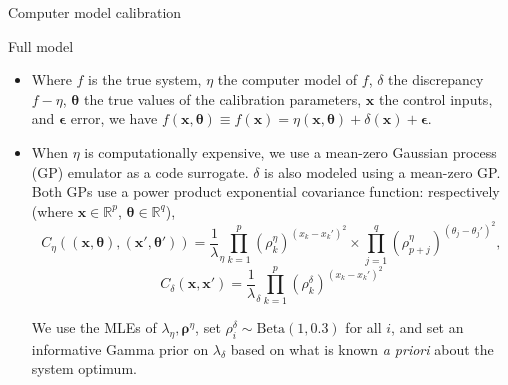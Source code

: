 \documentclass[final]{beamer}
\newlength{\onecolwid}
\begin{document}
\begin{frame}[t]
\begin{columns}[t]
\begin{column}{\onecolwid}
\begin{alertblock}{Computer model calibration}
\begin{itemize}
\end{itemize}

\end{alertblock}


\begin{alertblock}{Full model}

\begin{itemize}

\item Where $f$ is the true system, $\eta$ the computer model of $f$, $\delta$ the discrepancy $f-\eta$, $\boldsymbol \theta$ the true values of the calibration parameters, $\mathbf x$ the control inputs, and $\boldsymbol \epsilon$ error, we have $f(\mathbf x,\boldsymbol \theta) \equiv f(\mathbf x) = \eta(\mathbf x,\boldsymbol \theta) + \delta(\mathbf x) + \boldsymbol \epsilon$.
%
\item When $\eta$ is computationally expensive, we use a mean-zero Gaussian process (GP) emulator as a code surrogate.
%
%
$\delta$ is also modeled using a mean-zero GP. Both GPs use a power product exponential covariance function: respectively (where $\mathbf x\in\mathbb R^p$, $\boldsymbol\theta\in\mathbb R^q$),
\vspace{-3mm}
\[
C_\eta(\!(\mathbf x,\!\boldsymbol\theta),\!(\mathbf x'\!,\!\boldsymbol\theta')\!)\! = \frac1\lambda_\eta \prod_{k=1}^{p}\left(\rho^\eta_k\right)^{\left(x_k -x_k'\right)^2}
\times
\prod_{j=1}^{q}\left( \rho^\eta_{p+j}\right)^{\left(\theta_j-\theta_j'\right)^2},
\]
\vspace{-5mm}
\[
C_\delta(\mathbf x,\mathbf x') = \frac1\lambda_\delta \prod_{k=1}^{p}\left(\rho^\delta_k\right)^{\left(x_k -x_k'\right)^2}
\]

\vspace{-8mm}
We use the MLEs of $\lambda_\eta,\boldsymbol\rho^\eta$, set $\rho_i^\delta\sim\mathrm{Beta}(1,0.3)$ for all $i$, and set an informative Gamma prior on $\lambda_\delta$ based on what is known \textit{a priori} about the system optimum.


\end{itemize}
\end{alertblock}
\end{column}
\end{columns}
\end{frame}
\end{document}

